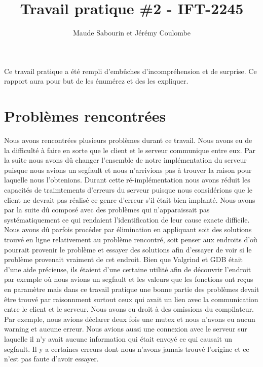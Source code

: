 \documentclass[11pt]{article}
\title{Travail pratique \#2 - IFT-2245}
\author{Maude Sabourin et Jérémy Coulombe}
\begin{document}
\maketitle

Ce travail pratique a été rempli d'embûches d'incompréhension et de surprise.  Ce rapport aura pour but de les énumérez et des les expliquer. 

\section{Problèmes rencontrées}

Nous avons rencontrées plusieurs problèmes durant ce travail. Nous avons eu de la difficulté à faire en sorte que le client et le serveur communique entre eux. Par la suite nous avons dû changer l'ensemble de notre implémentation du serveur puisque nous avions un segfault et nous n'arrivions pas à trouver la raison pour laquelle nous l'obtenions. Durant cette ré-implémentation nous avons réduit les capacités de traimtements d'erreurs du serveur puisque nous considérions que le client ne devrait pas réalisé ce genre d'erreur s'il était bien implanté. Nous avons par la suite dû composé avec des problèmes qui n'apparaissait pas systématiquement ce qui rendaient l'identification de leur cause exacte difficile. Nous avons dû parfois procéder par élimination en appliquant soit des solutions trouvé en ligne relativement au problème rencontré, soit penser aux endroits d'où pourrait provenir le problème et essayer des solutions afin d'essayer de voir si le problème provenait vraiment de cet endroit. Bien que Valgrind et GDB était d'une aide précieuse, ils étaient d'une certaine utilité afin de découvrir l'endroit par exemple où nous avions un segfault et les valeurs que les fonctions ont reçus en paramètre mais dans ce travail pratique une bonne partie des problèmes devait être trouvé par raisonnment surtout ceux qui avait un lien avec la communication entre le client et le serveur. Nous avons eu droit à des omissions du compilateur. Par exemple, nous avions déclarer deux fois une mutex et nous n'avons eu aucun warning et aucune erreur. Nous avions aussi une connexion avec le serveur sur laquelle il n'y avait aucune information qui était envoyé ce qui causait un segfault. Il y a certaines erreurs dont nous n'avons jamais trouvé l'origine et ce n'est pas faute d'avoir essayer. 
\end{document}
